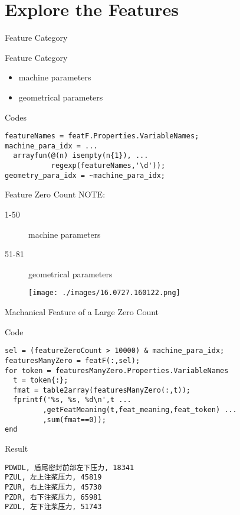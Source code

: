 \documentclass[bigger]{beamer}
\begin{document}
\section{Explore the Features}
\label{sec-3}
\begin{frame}[fragile,label=sec-3-1]{Feature Category}
 \begin{block}{Feature Category}
\begin{itemize}
\item machine parameters
\item geometrical parameters
\end{itemize}
\end{block}
\begin{block}{Codes}
\begin{verbatim}
featureNames = featF.Properties.VariableNames;
machine_para_idx = ...
  arrayfun(@(n) isempty(n{1}), ...
           regexp(featureNames,'\d'));
geometry_para_idx = ~machine_para_idx;
\end{verbatim}
\end{block}
\end{frame}
\begin{frame}[label=sec-3-2]{Feature Zero Count}
NOTE:
\begin{description}
\item[{1-50}] machine parameters
\item[{51-81}] geometrical parameters
\end{description}
\begin{figure}[htb]
\centering
\texttt{[image: ./images/16.0727.160122.png]}
\end{figure}
\end{frame}
\begin{frame}[fragile,label=sec-3-3]{Machanical Feature of a Large Zero Count}
 \begin{block}{Code}
\begingroup 
\footnotesize
\begin{verbatim}
sel = (featureZeroCount > 10000) & machine_para_idx;
featuresManyZero = featF(:,sel);
for token = featuresManyZero.Properties.VariableNames
  t = token{:};
  fmat = table2array(featuresManyZero(:,t));
  fprintf('%s, %s, %d\n',t ...
         ,getFeatMeaning(t,feat_meaning,feat_token) ...
         ,sum(fmat==0));
end
\end{verbatim}
\endgroup
\end{block}
\begin{block}{Result}
\begingroup 
\footnotesize
\begin{verbatim}
PDWDL, 盾尾密封前部左下压力, 18341
PZUL, 左上注浆压力, 45819
PZUR, 右上注浆压力, 45730
PZDR, 右下注浆压力, 65981
PZDL, 左下注浆压力, 51743
\end{verbatim}
\endgroup
\end{block}
\end{frame}
\end{document}
